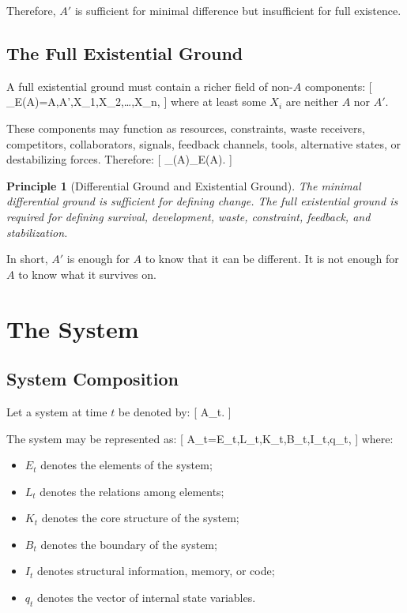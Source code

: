 \documentclass[11pt,a4paper]{article}
\newtheorem{principle}{Principle}
\begin{document}
Therefore, $A'$ is sufficient for minimal difference but insufficient for full existence.

\subsection{The Full Existential Ground}

A full existential ground must contain a richer field of non-$A$ components:
[
\Omega_E(A)={A,A',X_1,X_2,\ldots,X_n},
]
where at least some $X_i$ are neither $A$ nor $A'$.

These components may function as resources, constraints, waste receivers, competitors, collaborators, signals, feedback channels, tools, alternative states, or destabilizing forces. Therefore:
[
\Omega_{\Delta}(A)\subset\Omega_E(A).
]

\begin{principle}[Differential Ground and Existential Ground]
The minimal differential ground is sufficient for defining change. The full existential ground is required for defining survival, development, waste, constraint, feedback, and stabilization.
\end{principle}

In short, $A'$ is enough for $A$ to know that it can be different. It is not enough for $A$ to know what it survives on.

\section{The System}

\subsection{System Composition}

Let a system at time $t$ be denoted by:
[
A_t.
]

The system may be represented as:
[
A_t={E_t,L_t,K_t,B_t,I_t,q_t},
]
where:
\begin{itemize}[leftmargin=2em]
\item $E_t$ denotes the elements of the system;
\item $L_t$ denotes the relations among elements;
\item $K_t$ denotes the core structure of the system;
\item $B_t$ denotes the boundary of the system;
\item $I_t$ denotes structural information, memory, or code;
\item $q_t$ denotes the vector of internal state variables.
\end{itemize}
\end{document}
